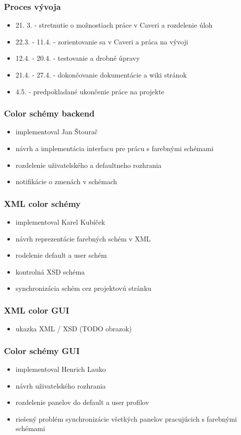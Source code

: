 \documentclass[slovak]{beamer}
\begin{document}
\begin{frame}
\frametitle{Proces vývoja}
	\begin{itemize}
		\item 21. 3. - stretnutie o možnostiach práce v Caveri a rozdelenie úloh
		\item 22.3. - 11.4. - zorientovanie sa v Caveri a práca na vývoji
		\item 12.4. - 20.4. - testovanie a drobné úpravy
		\item 21.4. - 27.4. - dokončovanie dokumentácie a wiki stránok
		\item 4.5. - predpokladané ukončenie práce na projekte
	\end{itemize}
\end{frame}

\begin{frame}
\frametitle{Color schémy backend}
	\begin{itemize}
		\item implementoval Jan Štourač
		\item návrh a implementácia interfacu pre prácu s farebnými schémami
		\item rozdelenie uživatelského a defaultneho rozhrania
		\item notifikácie o zmenách v schémach
	\end{itemize}
\end{frame}

\begin{frame}
\frametitle{XML color schémy}
	\begin{itemize}
		\item implementoval Karel Kubíček
		\item návrh reprezentácie farebných schém v XML
		\item rodelenie default a user schém
		\item kontrolná XSD schéma
		\item synchronizácia schém cez projektovú stránku
	\end{itemize}
\end{frame}

\begin{frame}
\frametitle{XML color GUI}
	\begin{itemize}
		\item ukazka XML / XSD (TODO obrazok)
	\end{itemize}
\end{frame}

\begin{frame}
\frametitle{Color schémy GUI}
	\begin{itemize}
		\item implementoval Henrich Lauko
		\item návrh uživatelského rozhrania
		\item rozdelenie panelov do default a user profilov
		\item riešený problém synchronizácie všetkých panelov pracujúcich s farebnými schémami
	\end{itemize}
\end{frame}
\end{document}
